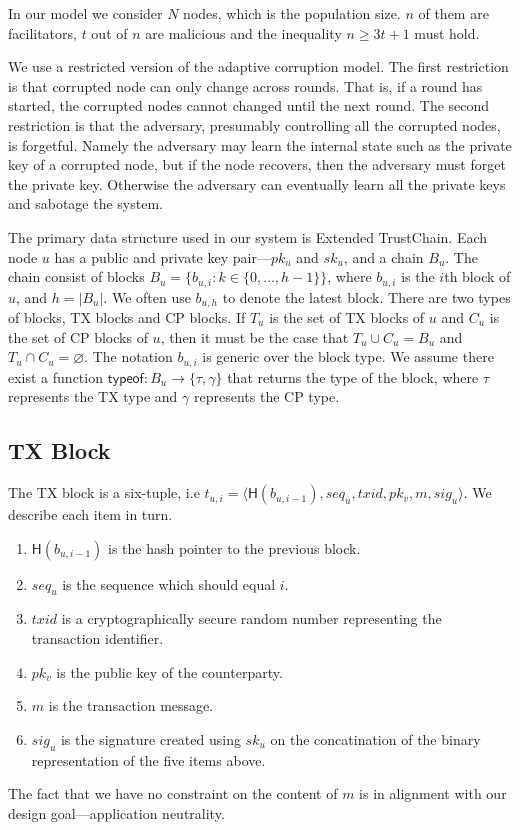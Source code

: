 In our model we consider $N$ nodes, which is the population size.
$n$ of them are facilitators, $t$ out of $n$ are malicious and the inequality
$n \ge 3t + 1$ must hold.

We use a restricted version of the adaptive corruption model.
The first restriction is that corrupted node can only change across rounds.
That is, if a round has started, the corrupted nodes cannot changed until the next round.
The second restriction is that the adversary, presumably controlling all the corrupted nodes, is forgetful.
Namely the adversary may learn the internal state such as the private key of a corrupted node,
but if the node recovers, then the adversary must forget the private key.
Otherwise the adversary can eventually learn all the private keys and sabotage the system.

The primary data structure used in our system is Extended TrustChain.
Each node $u$ has a public and private key pair---$pk_u$ and $sk_u$, and a chain $B_u$.
The chain consist of blocks $B_u = \{ b_{u, i} : k \in \{ 0, \dots, h - 1 \} \}$,
where $b_{u, i}$ is the $i$th block of $u$,
and $h = |B_u|$.
We often use $b_{u, h}$ to denote the latest block.
There are two types of blocks, TX blocks and CP blocks.
If $T_u$ is the set of TX blocks of $u$ and $C_u$ is the set of CP blocks of $u$,
then it must be the case that $T_u \cup C_u = B_u$ and $T_u \cap C_u = \varnothing$.
The notation $b_{u, i}$ is generic over the block type.
We assume there exist a function $\textsf{typeof}: B_u \rightarrow \{ \tau, \gamma \}$ that returns the type of the block,
where $\tau$ represents the TX type and $\gamma$ represents the CP type.

\subsection{TX Block}
The TX block is a six-tuple, i.e $t_{u, i} = \langle \textsf{H}(b_{u, i - 1}), seq_u, txid, pk_v, m, sig_u \rangle$.
We describe each item in turn.
\begin{enumerate}
\item $\textsf{H}(b_{u, i - 1})$ is the hash pointer to the previous block.
\item $seq_u$ is the sequence which should equal $i$.
\item $txid$ is a cryptographically secure random number representing the transaction identifier.
\item $pk_v$ is the public key of the counterparty.
\item $m$ is the transaction message.
\item $sig_u$ is the signature created using $sk_u$ on the concatination of the binary representation of the five items above.
\end{enumerate}
The fact that we have no constraint on the content of $m$ is in alignment with our design goal---application neutrality.

